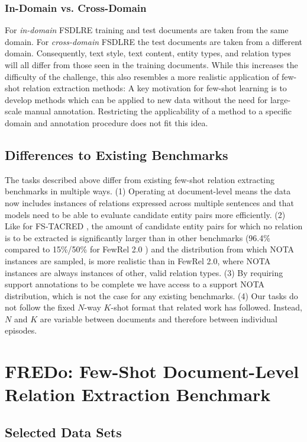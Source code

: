 \documentclass[11pt]{article}
\begin{document}
\subsubsection{In-Domain vs. Cross-Domain}
For \textit{in-domain} FSDLRE training and test documents are taken from the same domain. 
For \textit{cross-domain} FSDLRE the test documents are taken from a different domain. 
Consequently, text style, text content, entity types, and relation types will all differ from those seen in the training documents. While this increases the difficulty of the challenge, this also resembles a more realistic application of few-shot relation extraction methods:
A key motivation for few-shot learning is to develop methods which can be applied to new data without the need for large-scale manual annotation. Restricting the applicability of a method to a specific domain and annotation procedure does not fit this idea.

\subsection{Differences to Existing Benchmarks}
The tasks described above differ from existing few-shot relation extracting benchmarks in multiple ways.
(1) Operating at document-level means the data now includes instances of relations expressed across multiple sentences and that models need to be able to evaluate candidate entity pairs more efficiently.
(2) Like for FS-TACRED \cite{sabo_revisiting_2021}, the amount of candidate entity pairs for which no relation is to be extracted is significantly larger than in other benchmarks (96.4\% compared to 15\%/50\% for FewRel 2.0 \cite{gao_fewrel_2019}) and the distribution from which NOTA instances are sampled, is more realistic than in FewRel 2.0, where NOTA instances are always instances of other, valid relation types.
(3) By requiring support annotations to be complete we have access to a support NOTA distribution, which is not the case for any existing benchmarks.
(4) Our tasks do not follow the fixed $N$-way $K$-shot format that related work has followed. Instead, $N$ and $K$ are variable between documents and therefore between individual episodes. 




\section{FREDo: Few-Shot Document-Level Relation Extraction Benchmark}
\label{sec:benchmark}
\subsection{Selected Data Sets}
\end{document}
